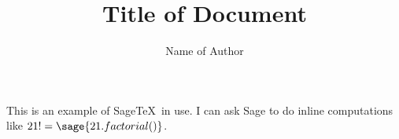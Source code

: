 \documentclass{amsart}
\title{Title of Document}
\author{Name of Author}
\begin{document}
\maketitle

This is an example of Sage\TeX\ in use. I can ask Sage to do inline computations like $21! = \sage{21.factorial()}$.
\end{document}
